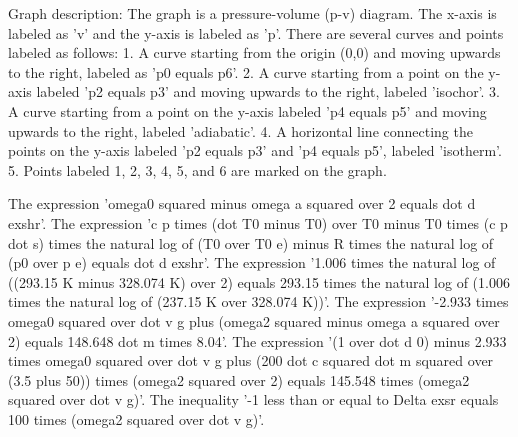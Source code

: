 Graph description:
The graph is a pressure-volume (p-v) diagram. The x-axis is labeled as 'v' and the y-axis is labeled as 'p'.
There are several curves and points labeled as follows:
1. A curve starting from the origin (0,0) and moving upwards to the right, labeled as 'p0 equals p6'.
2. A curve starting from a point on the y-axis labeled 'p2 equals p3' and moving upwards to the right, labeled 'isochor'.
3. A curve starting from a point on the y-axis labeled 'p4 equals p5' and moving upwards to the right, labeled 'adiabatic'.
4. A horizontal line connecting the points on the y-axis labeled 'p2 equals p3' and 'p4 equals p5', labeled 'isotherm'.
5. Points labeled 1, 2, 3, 4, 5, and 6 are marked on the graph.

The expression 'omega0 squared minus omega a squared over 2 equals dot d exshr'.
The expression 'c p times (dot T0 minus T0) over T0 minus T0 times (c p dot s) times the natural log of (T0 over T0 e) minus R times the natural log of (p0 over p e) equals dot d exshr'.
The expression '1.006 times the natural log of ((293.15 K minus 328.074 K) over 2) equals 293.15 times the natural log of (1.006 times the natural log of (237.15 K over 328.074 K))'.
The expression '-2.933 times omega0 squared over dot v g plus (omega2 squared minus omega a squared over 2) equals 148.648 dot m times 8.04'.
The expression '(1 over dot d 0) minus 2.933 times omega0 squared over dot v g plus (200 dot c squared dot m squared over (3.5 plus 50)) times (omega2 squared over 2) equals 145.548 times (omega2 squared over dot v g)'.
The inequality '-1 less than or equal to Delta exsr equals 100 times (omega2 squared over dot v g)'.
